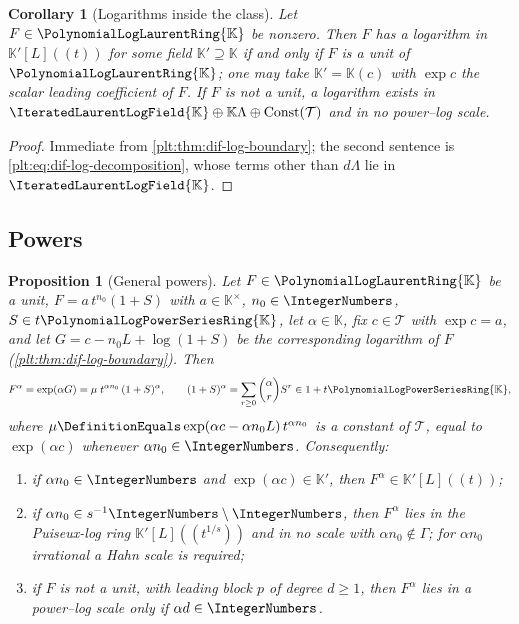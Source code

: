 \documentclass[11pt,oneside]{article}
\theoremstyle{plain}
\newtheorem{proposition}[theorem]{Proposition}
\newtheorem{corollary}[theorem]{Corollary}
\theoremstyle{definition}
\theoremstyle{remark}
\newcommand{\K}{\mathbb{K}}
\newcommand{\PLpow}{\PolynomialLogPowerSeriesRing{\K}}   %
\newcommand{\PLlau}{\PolynomialLogLaurentRing{\K}}       %
\newcommand{\PLit}{\IteratedLaurentLogField{\K}}         %
\begin{document}
\begin{corollary}[Logarithms inside the class]\label{plt:cor:dif-log-unit}
Let \(F\in\PLlau\) be nonzero.  Then \(F\) has a logarithm in \(\K'[L]((t))\)
for some field \(\K'\supseteq\K\) if and only if \(F\) is a unit of
\(\PLlau\); one may take \(\K'=\K(c)\) with \(\exp c\) the scalar leading
coefficient of \(F\).  If \(F\) is not a unit, a logarithm exists in
\(\PLit\oplus\K\Lambda\oplus\operatorname{Const}(\mathcal T)\) and in no
power--log scale.
\end{corollary}

\begin{proof}
Immediate from \cref{plt:thm:dif-log-boundary}; the second sentence is
\cref{plt:eq:dif-log-decomposition}, whose terms other than \(d\Lambda\) lie in
\(\PLit\).
\end{proof}

\subsection{Powers}
\label{plt:sec:dif-powers}

\begin{proposition}[General powers]\label{plt:prop:dif-powers}
Let \(F\in\PLlau\) be a unit, \(F=a\,t^{n_{0}}(1+S)\) with \(a\in\K^{\times}\),
\(n_{0}\in\IntegerNumbers\), \(S\in t\PLpow\), let \(\alpha\in\K\), fix
\(c\in\mathcal T\) with \(\exp c=a\), and let
\(G=c-n_{0}L+\log(1+S)\) be the corresponding logarithm of \(F\)
(\cref{plt:thm:dif-log-boundary}).  Then
\begin{equation}\label{plt:eq:dif-power-value}
  F^{\alpha}=\exp(\alpha G)
  =\mu\;t^{\alpha n_{0}}\,(1+S)^{\alpha},
  \qquad
  (1+S)^{\alpha}=\sum_{r\ge0}\binom{\alpha}{r}S^{r}\in1+t\PLpow ,
\end{equation}
where \(\mu\DefinitionEquals\exp(\alpha c-\alpha n_{0}L)\,t^{\alpha n_{0}}\) is
a constant of \(\mathcal T\), equal to \(\exp(\alpha c)\) whenever
\(\alpha n_{0}\in\IntegerNumbers\).  Consequently:
\begin{enumerate}
\item if \(\alpha n_{0}\in\IntegerNumbers\) and \(\exp(\alpha c)\in\K'\), then
      \(F^{\alpha}\in\K'[L]((t))\);
\item if \(\alpha n_{0}\in s^{-1}\IntegerNumbers\setminus\IntegerNumbers\),
      then \(F^{\alpha}\) lies in the Puiseux-log ring \(\K'[L]((t^{1/s}))\)
      and in no scale with \(\alpha n_{0}\notin\Gamma\); for
      \(\alpha n_{0}\) irrational a Hahn scale is required;
\item if \(F\) is not a unit, with leading block \(p\) of degree \(d\ge1\),
      then \(F^{\alpha}\) lies in a power--log scale only if
      \(\alpha d\in\IntegerNumbers\).
\end{enumerate}
\end{proposition}
\end{document}
